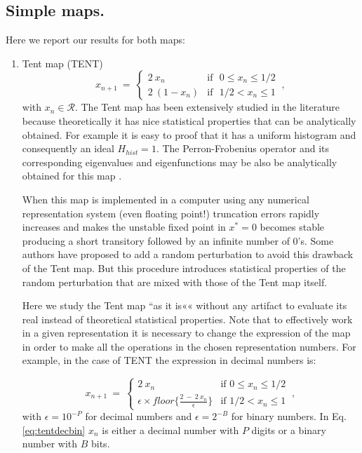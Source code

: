 \subsection {Simple maps.}\label{subsec:simples}
Here we report our results for both maps:
\begin{enumerate}
%
\item Tent map (TENT)
\begin{equation}\label{eq:tentmap}
x_{n+1}~=~ \left\{ \begin{array}{ll}
2~{x_n} & \textrm{if ~$0\leq x_n\leq 1/2$}\\
2~(1-{x_n}) & \textrm{if ~$1/2<x_n\leq 1$} 
\end{array} \right.  \ ,
\end{equation}
with $x_n\in\mathcal{R}$.
%
The Tent map has been extensively studied in the literature because theoretically it has nice  statistical properties that can be analytically obtained. For example it is easy to proof that it has a uniform histogram and consequently an ideal $H_{hist}=1$. The Perron-Frobenius operator and its corresponding eigenvalues and eigenfunctions may be also be analytically obtained for this map \cite{tent}. 

When this map is implemented in a computer using any numerical representation system (even floating point!) truncation errors rapidly increases and makes the unstable fixed point in $x^*=0$ becomes stable producing a short transitory followed by an infinite number of  $0$'s\cite{Jessa1993,Callegari1997}. Some authors \cite{buscar} have proposed to add a random perturbation to avoid this drawback of the Tent map. But this procedure introduces statistical properties of the random perturbation that are mixed with those of the Tent map itself.

Here we study the Tent map ``as it is«« without any artifact to evaluate its real instead of theoretical statistical properties. Note that to effectively work in a given representation it is necessary to change the expression of the map in order to make all the operations in the chosen representation numbers. For example, in the case of TENT the expression in decimal numbers is:

\begin{equation}\label{eq:tentdecbin}
x_{n+1}~=~ \left\{ \begin{array}{ll}
2~{x_n} & \textrm{if $0\leq x_n\leq 1/2$}\\
\epsilon \times floor\{\frac{2~-~2~x_n}{\epsilon}\} & \textrm{if $1/2<x_n\leq 1$} 
\end{array} \right.  \ ,
\end{equation}
with $\epsilon=10^{-P}$ for decimal numbers and $\epsilon=2^{-B}$ for binary numbers. In Eq. \ref{eq:tentdecbin} $x_n$ is either a decimal number with $P$ digits or a binary number with $B$ bits.


\end{enumerate}
